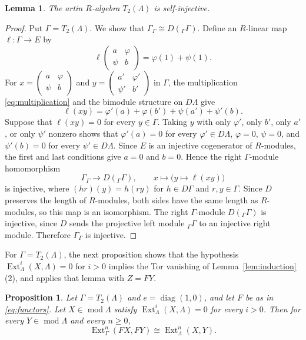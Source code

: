 \documentclass[a4paper,reqno,10pt]{amsart}
\newtheorem{proposition}[theorem]{Proposition}
\newtheorem{lemma}[theorem]{Lemma}
\theoremstyle{definition}
\numberwithin{equation}{section}
\newcommand{\Ext}{\operatorname{Ext}}
\newcommand{\modu}{\operatorname{mod}}
\begin{document}
\begin{lemma}\label{lem:self-injective}
The artin $R$-algebra $T_2(\Lambda)$ is self-injective.
\end{lemma}

\begin{proof}
Put $\Gamma=T_2(\Lambda)$.  We show that
$\Gamma_\Gamma\cong D({}_\Gamma\Gamma)$.  Define an $R$-linear map
$\ell\colon\Gamma\to E$ by
\[
 \ell\!\begin{pmatrix}a&\varphi\\\psi&b\end{pmatrix}
 =\varphi(1)+\psi(1).
\]
For
$x=\begin{pmatrix}a&\varphi\\\psi&b\end{pmatrix}$ and
$y=\begin{pmatrix}a'&\varphi'\\\psi'&b'\end{pmatrix}$ in $\Gamma$, the
multiplication \eqref{eq:multiplication} and the bimodule structure on
$D\Lambda$ give
\[
 \ell(xy)=\varphi'(a)+\varphi(b')+\psi(a')+\psi'(b).
\]
Suppose that $\ell(xy)=0$ for every $y\in\Gamma$.  Taking $y$ with only
$\varphi'$, only $b'$, only $a'$, or only $\psi'$ nonzero shows that
$\varphi'(a)=0$ for every $\varphi'\in D\Lambda$, $\varphi=0$, $\psi=0$, and
$\psi'(b)=0$ for every $\psi'\in D\Lambda$.  Since $E$ is an injective
cogenerator of $R$-modules, the first and last conditions give $a=0$ and
$b=0$.  Hence the right $\Gamma$-module homomorphism
\[
 \Gamma_\Gamma\longrightarrow D({}_\Gamma\Gamma),\qquad
 x\longmapsto\bigl(y\longmapsto\ell(xy)\bigr)
\]
is injective, where $(h r)(y)=h(ry)$ for $h\in D\Gamma$ and $r,y\in\Gamma$.
Since $D$ preserves the length of $R$-modules, both sides have the same
length as $R$-modules, so this map is an isomorphism.  The right $\Gamma$-module $D({}_\Gamma\Gamma)$ is injective,
since $D$ sends the projective left module ${}_\Gamma\Gamma$ to an injective
right module.  Therefore $\Gamma_\Gamma$ is injective.
\end{proof}

For $\Gamma=T_2(\Lambda)$, the next proposition shows that the hypothesis
$\Ext_\Lambda^i(X,\Lambda)=0$ for $i>0$ implies the Tor vanishing of
Lemma~\ref{lem:induction}(2), and applies that lemma with $Z=FY$.

\begin{proposition}\label{prop:transport}
Let $\Gamma=T_2(\Lambda)$ and $e=\operatorname{diag}(1,0)$, and let $F$ be
as in \eqref{eq:functors}.  Let $X\in\modu\Lambda$ satisfy
$\Ext_\Lambda^i(X,\Lambda)=0$ for every $i>0$.  Then for every
$Y\in\modu\Lambda$ and every $n\geq0$,
\[
 \Ext_\Gamma^n(FX,FY)\cong\Ext_\Lambda^n(X,Y).
\]
\end{proposition}
\end{document}

